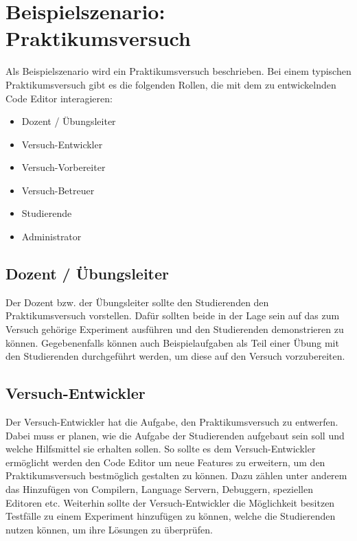\section{Beispielszenario: Praktikumsversuch} \label{beispielszenario}

Als Beispielszenario wird ein Praktikumsversuch beschrieben. Bei einem typischen Praktikumsversuch gibt es die folgenden Rollen, die mit dem zu entwickelnden Code Editor interagieren:

\begin{itemize}
    \item Dozent / Übungsleiter
    \item Versuch-Entwickler
    \item Versuch-Vorbereiter
    \item Versuch-Betreuer
    \item Studierende
    \item Administrator
\end{itemize}

\subsection{Dozent / Übungsleiter}

Der Dozent bzw. der Übungsleiter sollte den Studierenden den Praktikumsversuch vorstellen. Dafür sollten beide in der Lage sein auf das zum Versuch gehörige Experiment ausführen und den Studierenden demonstrieren zu können. Gegebenenfalls können auch Beispielaufgaben als Teil einer Übung mit den Studierenden durchgeführt werden, um diese auf den Versuch vorzubereiten.

\subsection{Versuch-Entwickler}

Der Versuch-Entwickler hat die Aufgabe, den Praktikumsversuch zu entwerfen. Dabei muss er planen, wie die Aufgabe der Studierenden aufgebaut sein soll und welche Hilfsmittel sie erhalten sollen. So sollte es dem Versuch-Entwickler ermöglicht werden den Code Editor um neue Features zu erweitern, um den Praktikumsversuch bestmöglich gestalten zu können. Dazu zählen unter anderem das Hinzufügen von Compilern, Language Servern, Debuggern, speziellen Editoren etc. Weiterhin sollte der Versuch-Entwickler die Möglichkeit besitzen Testfälle zu einem Experiment hinzufügen zu können, welche die Studierenden nutzen können, um ihre Lösungen zu überprüfen.

